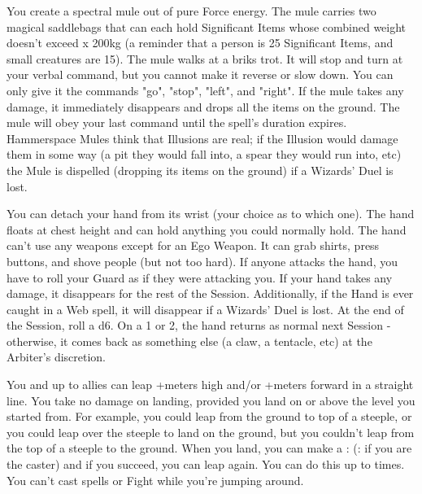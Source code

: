 {You create a spectral mule out of pure Force energy. The mule carries two
magical saddlebags that can each hold \SUMDICE Significant Items whose
combined weight doesn't exceed \DICE x 200kg (a reminder that a person is 25
Significant Items, and small creatures are 15).  The mule walks at a briks
trot.  It will stop and turn at your verbal command, but you cannot make it
reverse or slow down. You can only give it the commands "go", "stop",
"left", and "right". If the mule takes any damage, it immediately disappears
and drops all the items on the ground.  The mule will obey your last command
until the spell's duration expires.  Hammerspace Mules think that Illusions
are real; if the Illusion would damage them in some way (a pit they would
fall into, a spear they would run into, etc) the Mule is dispelled (dropping
its items on the ground) if a Wizards' Duel is lost.





\SPELL[
  Name=Helping Hand,
  Link=wizardry-helping-hand,
  Paradigm=Biomancy,
  Save=N,
  Duration=Concentration,
  Counter=\mylink{Web}{wizardry-web} ,
  Keywords=None,
  Target=Self
]



You can detach your hand from its wrist (your choice as to which one).  The
hand floats at chest height and can hold anything you could normally hold. 
The hand can't use any weapons except for an Ego Weapon.  It can grab
shirts, press buttons, and shove people (but not too hard).  If anyone
attacks the hand, you have to roll your Guard as if they were attacking you. 
If your hand takes any damage, it disappears for the rest of the Session. 
Additionally, if the Hand is ever caught in a Web spell, it will disappear
if a Wizards' Duel is lost.  At the end of the Session, roll a d6.  On a 1
or 2, the hand returns as normal next Session - otherwise, it comes back as
something else (a claw, a tentacle, etc) at the Arbiter's discretion.



\SPELL[
  Name=Heroic Leap,
  Link=wizardry-heroic-leap,
  Paradigm=Biomancy,
  Save=N,
  Duration=0,
  Counter=None ,
  Keywords=None,
  Target=Self or Close Ally
]



You and up to  allies can leap \VIG+\SUMDICE meters high and/or
\VIG+\SUMDICE meters forward in a straight line.  You take no damage on
landing, provided you land on or above the level you started from. For
example, you could leap from the ground to top of a steeple, or you could
leap over the steeple to land on the ground, but you couldn't leap from the
top of a steeple to the ground.  When you land, you can make a \RS : \DEX
(\RS : \INT if you are the caster) and if you succeed,
you can leap again. You can do this up to \DICE times.  You can't cast
spells or Fight while you're jumping around.





}

